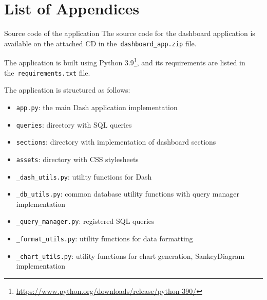 \appendix
{}
\chapter*{List of Appendices}
\renewcommand{\thesection}{Appendix \Alph{section}}

\begin{section}{Source code of the application}
	\label{appendix:source-code}
	The source code for the dashboard application is available on the attached CD in the~\texttt{dashboard\_app.zip} file.

	The application is built using Python 3.9\footnote{\url{https://www.python.org/downloads/release/python-390/}}, and its requirements are listed in the~\texttt{requirements.txt} file.

	The application is structured as follows:
	\begin{itemize}
		\item \texttt{app.py}: the main Dash application implementation
		\item \texttt{queries\/}: directory with SQL queries
		\item \texttt{sections\/}: directory with implementation of dashboard sections
		\item \texttt{assets\/}: directory with CSS stylesheets
		\item \texttt{\_dash\_utils.py}: utility functions for Dash
		\item \texttt{\_db\_utils.py}: common database utility functions with query manager implementation
		\item \texttt{\_query\_manager.py}: registered SQL queries
		\item \texttt{\_format\_utils.py}: utility functions for data formatting
		\item \texttt{\_chart\_utils.py}: utility functions for chart generation, SankeyDiagram implementation
	\end{itemize}

\end{section}